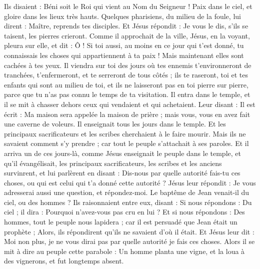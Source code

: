 \begin{multicols}{2}
Ils disaient : Béni soit le Roi qui vient au Nom du Seigneur ! Paix dans le ciel, et gloire dans les lieux très hauts.
Quelques pharisiens, du milieu de la foule, lui dirent : Maître, reprends tes disciples.
Et Jésus répondit : Je vous le dis, s’ils se taisent, les pierres crieront.
Comme il approchait de la ville, Jésus, en la voyant, pleura sur elle, et dit :
Ô ! Si toi aussi, au moins en ce jour qui t’est donné, tu connaissais les choses qui appartiennent à ta paix ! Mais maintenant elles sont cachées à tes yeux.
Il viendra sur toi des jours où tes ennemis t'environneront de tranchées, t'enfermeront, et te serreront de tous côtés ;
ils te raseront, toi et tes enfants qui sont au milieu de toi, et ils ne laisseront pas en toi pierre sur pierre, parce que tu n'as pas connu le temps de ta visitation.
Il entra dans le temple, et il se mit à chasser dehors ceux qui vendaient et qui achetaient.
Leur disant : Il est écrit : Ma maison sera appelée la maison de prière ; mais vous, vous en avez fait une caverne de voleurs.
Il enseignait tous les jours dans le temple. Et les principaux sacrificateurs et les scribes cherchaient à le faire mourir.
Mais ils ne savaient comment s’y prendre ; car tout le peuple s’attachait à ses paroles.
\VerseOne{}Et il arriva un de ces jours-là, comme Jésus enseignait le peuple dans le temple, et qu'il évangélisait, les principaux sacrificateurs, les scribes et les anciens survinrent,
et lui parlèrent en disant : Dis-nous par quelle autorité fais-tu ces choses, ou qui est celui qui t'a donné cette autorité ?
Jésus leur répondit : Je vous adresserai aussi une question, et répondez-moi.
Le baptême de Jean venait-il du ciel, ou des hommes ?
Ils raisonnaient entre eux, disant : Si nous répondons : Du ciel ; il dira : Pourquoi n’avez-vous pas cru en lui ?
Et si nous répondons : Des hommes, tout le peuple nous lapidera ; car il est persuadé que Jean était un prophète ;
Alors, ils répondirent qu'ils ne savaient d'où il était.
Et Jésus leur dit : Moi non plus, je ne vous dirai pas par quelle autorité je fais ces choses.
Alors il se mit à dire au peuple cette parabole : Un homme planta une vigne, et la loua à des vignerons, et fut longtemps absent.

\end{multicols}
